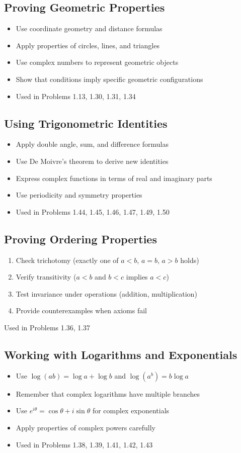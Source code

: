 \subsection*{Proving Geometric Properties}
\begin{itemize}
\item Use coordinate geometry and distance formulas
\item Apply properties of circles, lines, and triangles
\item Use complex numbers to represent geometric objects
\item Show that conditions imply specific geometric configurations
\item Used in Problems 1.13, 1.30, 1.31, 1.34
\end{itemize}

\subsection*{Using Trigonometric Identities}
\begin{itemize}
\item Apply double angle, sum, and difference formulas
\item Use De Moivre's theorem to derive new identities
\item Express complex functions in terms of real and imaginary parts
\item Use periodicity and symmetry properties
\item Used in Problems 1.44, 1.45, 1.46, 1.47, 1.49, 1.50
\end{itemize}

\subsection*{Proving Ordering Properties}
\begin{enumerate}
\item Check trichotomy (exactly one of $a < b$, $a = b$, $a > b$ holds)
\item Verify transitivity ($a < b$ and $b < c$ implies $a < c$)
\item Test invariance under operations (addition, multiplication)
\item Provide counterexamples when axioms fail
\end{enumerate}
Used in Problems 1.36, 1.37

\subsection*{Working with Logarithms and Exponentials}
\begin{itemize}
\item Use $\log(ab) = \log a + \log b$ and $\log(a^b) = b \log a$
\item Remember that complex logarithms have multiple branches
\item Use $e^{i\theta} = \cos \theta + i \sin \theta$ for complex exponentials
\item Apply properties of complex powers carefully
\item Used in Problems 1.38, 1.39, 1.41, 1.42, 1.43
\end{itemize}

